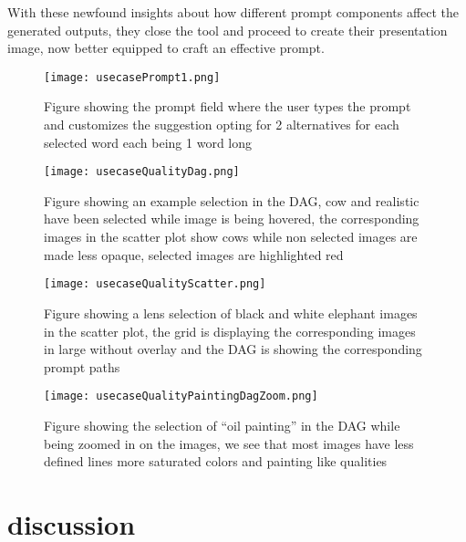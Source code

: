 \documentclass[
  a4paper,  %
  twoside,  %
  bibliography=totoc,
  headsepline,
  cleardoublepage=empty,
  parskip=half,
  draft=false
]{scrbook}
\begin{document}
 With these newfound insights about how different prompt components affect the generated outputs, they close the tool and proceed to create their presentation image, now better equipped to craft an effective prompt.
\begin{figure}[H]
	\centering
	\texttt{[image: usecasePrompt1.png]}
	\caption{Figure showing the prompt field where the user types the prompt and customizes the suggestion opting for 2 alternatives for each selected word each being 1 word long}
	\label{fig:usecasePrompt1}
\end{figure}
\begin{figure}[H]
		\centering
	\texttt{[image: usecaseQualityDag.png]}
	\caption{Figure showing an example selection in the DAG, cow and realistic have been selected while image is being hovered, the corresponding images in the scatter plot show cows while non selected images are made less opaque, selected images are highlighted red}
	\label{fig:usecaseQualityDag}
\end{figure}
\begin{figure}[H]
	\centering
	\texttt{[image: usecaseQualityScatter.png]}
	\caption{Figure showing a lens selection of black and white elephant images in the scatter plot, the grid is displaying the corresponding images in large without overlay and the DAG is showing the corresponding prompt paths}
	\label{fig:usecaseQualityScatter}
\end{figure}
\begin{figure}[H]
	\centering
	\texttt{[image: usecaseQualityPaintingDagZoom.png]}
	\caption{Figure showing the selection of \enquote{oil painting} in the DAG while being zoomed in on the images, we see that most images have less defined lines more saturated colors and painting like qualities }
	\label{fig:usecaseQualityPaintingDagZoom}
\end{figure}



\chapter{discussion}
\label{chap:zusfas}
\end{document}
